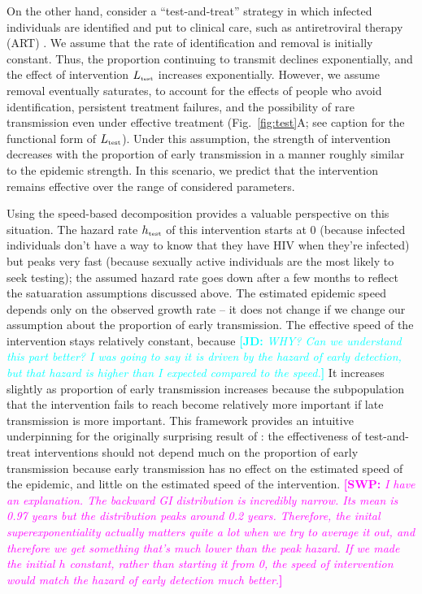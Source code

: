 \documentclass[12pt]{article}
\newcommand{\comment}[3]{\textcolor{#1}{\textbf{[#2: }\textit{#3}\textbf{]}}}
\newcommand{\jd}[1]{\comment{cyan}{JD}{#1}}
\newcommand{\swp}[1]{\comment{magenta}{SWP}{#1}}
\newcommand{\tsub}[2]{#1_{{\textrm{\tiny #2}}}}
\newcommand{\figref}[1]{Fig.~\ref{fig:#1}}
\begin{document}
On the other hand, consider a ``test-and-treat'' strategy in which infected individuals are identified and put to clinical care, such as antiretroviral therapy (ART) \citep{garnett2009treating, nah2017test}.
We assume that the rate of identification and removal is initially constant.
Thus, the proportion continuing to transmit declines exponentially, and the effect of intervention $\tsub{L}{test}$ increases exponentially.
However, we assume removal eventually saturates, to account for the effects of people who avoid identification, persistent treatment failures, and the possibility of rare transmission even under effective treatment
(\figref{test}A; see caption for the functional form of $\tsub{L}{test}$).
Under this assumption, the strength of intervention decreases with the proportion of early transmission in a manner roughly similar to the epidemic strength.
In this scenario, we predict that the intervention remains effective over the range of considered parameters.

Using the speed-based decomposition provides a valuable perspective on this situation.
The hazard rate $\tsub{h}{test}$ of this intervention starts at 0 (because infected individuals don't have a way to know that they have HIV when they're infected) but peaks very fast (because sexually active individuals are the most likely to seek testing); 
the assumed hazard rate goes down after a few months to reflect the satuaration assumptions discussed above. 
The estimated epidemic speed depends only on the observed growth rate -- it does not change if we change our assumption about the proportion of early transmission.
The effective speed of the intervention stays relatively constant, because \jd{WHY? Can we understand this part better? I was going to say it is driven by the hazard of early detection, but that hazard is higher than I expected compared to the speed.}  It increases slightly as proportion of early transmission increases because the subpopulation that the intervention fails to reach become relatively more important if late transmission is more important.
This framework provides an intuitive underpinning for the originally surprising result of \cite{eaton2014proportion}: the effectiveness of test-and-treat interventions should not depend much on the proportion of early transmission because early transmission has no effect on the estimated speed of the epidemic, and little on the estimated speed of the intervention.
\swp{I have an explanation. The backward GI distribution is incredibly narrow. Its mean is 0.97 years but the distribution peaks around 0.2 years. Therefore, the inital superexponentiality actually matters quite a lot when we try to average it out, and therefore we get something that's much lower than the peak hazard. If we made the initial $h$ constant, rather than starting it from 0, the speed of intervention would match the hazard of early detection much better.}
\end{document}
